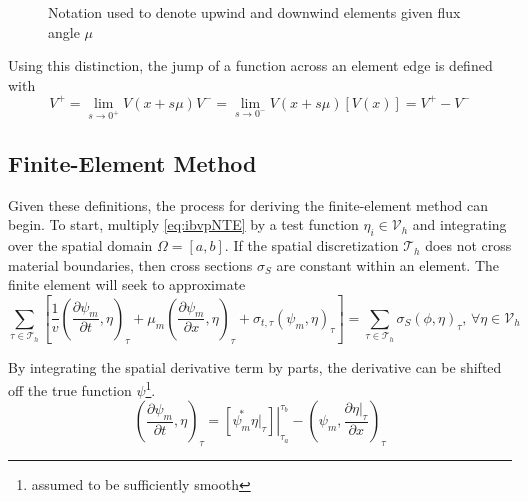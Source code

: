 \documentclass{article}
\newcommand{\mfesv}{\mathcal{V}_h}
\newcommand{\tauh}{\mathcal{T}_h}
\newcommand{\pdiff}[2]{\frac{\partial#1}{\partial#2}}
\newcommand{\ddx}[1]{\pdiff{#1}{x}}
\newcommand{\ddt}[1]{\pdiff{#1}{t}}
\newcommand{\dpmdx}{\ddx{\psi_m}}
\newcommand{\dpmdt}{\ddt{\psi_m}}
\newcommand{\forEtaInV}{,\,\forall\eta\in\mfesv}
\newcommand{\sumTaus}{\sum_{\tauinT}}
\newcommand{\tfem}{finite-element method }
\newcommand{\tauinT}{\tau\in\tauh}
\newcommand{\invv}{\frac{1}{v}}
\newcommand{\innerProd}[2]{\left(#1,#2\right)}
\newcommand{\tauInt}[2]{\innerProd{#1}{#2}_\tau}
\newcommand{\inTau}[1]{\left.#1\right\vert_{\tau}}
\begin{document}
\begin{figure}
    \centering
    \begin{tikzpicture}
        
    \end{tikzpicture}
    \caption{Notation used to denote upwind and downwind elements given flux angle $\mu$}
    \label{fig:upwDnw}
\end{figure}

Using this distinction, the jump of a function across an element edge is defined with
\begin{subequations}
    \begin{equation}
        V^+ = \lim_{s\rightarrow 0^+}V(x+s\mu)
    \end{equation}
    \begin{equation}
        V^- = \lim_{s\rightarrow 0^-}V(x+s\mu)
    \end{equation}
    \begin{equation}
        \label{eq:jumpDef}
        \left[V(x)\right] = V^+-V^-
    \end{equation}
\end{subequations}

\subsection{Finite-Element Method}
Given these definitions, the process for deriving the \tfem can begin. 
To start, multiply \cref{eq:ibvpNTE} by a test function $\eta_i\in\mfesv$ and integrating over
the spatial domain $\Omega=[a,b]$.
If the spatial discretization $\mathcal{T}_h$ does not cross material boundaries, then cross sections $\sigma_S$
are constant within an element.
The finite element will seek to approximate
\begin{equation}
    \label{eq:derive0}
    \sumTaus\left[
        \invv\tauInt{\dpmdt}{\eta}
        +\mu_m\tauInt{\dpmdx}{\eta}
        +\sigma_{t,\tau}\tauInt{\psi_m}{\eta}
    \right]
    = \sumTaus\sigma_S\tauInt{\phi}{\eta}
    \forEtaInV
\end{equation}

By integrating the spatial derivative term by parts, the derivative can be shifted off
the true function $\psi$\footnote{assumed to be sufficiently smooth}.
\begin{equation}
    \tauInt{\dpmdt}{\eta} = \left.\left[\overset{*}{\psi_m}\inTau{\eta}\right]\right\vert_{\tau_a}^{\tau_b}
        -\tauInt{\psi_m}{\ddx{\inTau{\eta}}}
\end{equation}
\end{document}
